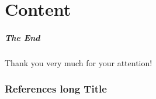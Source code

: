 \part{Content}










\begin{frame}
	\frametitle{The End}
	\centering
	Thank you very much for your attention!
\end{frame}


\appendix
\section[References]{References long Title}
\begin{frame}
	\small
	\printbibliography
\end{frame}




